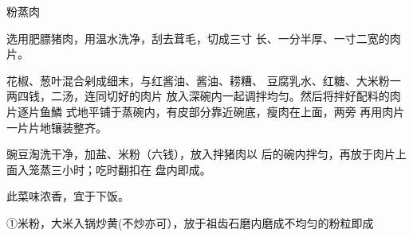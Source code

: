 \begin{recipe}{粉蒸肉}

\ingredients


\cooking

\step 	选用肥膘猪肉，用温水洗净，刮去茸毛，切成三寸 长、一分半厚、一寸二宽的肉片。

\step 	花椒、葱叶混合剁成细末，与红酱油、酱油、耢糟、 豆腐乳水、红糖、大米粉一两四钱，二汤，连同切好的肉片 放入深碗内一起调拌均匀。然后将拌好配料的肉片逐片鱼鱗 式地平铺于蒸碗内，有皮部分靠近碗底，瘦肉在上面，两旁 再用肉片一片片地镶装整齐。

\step 	豌豆淘洗干净，加盐、米粉（六钱），放入拌猪肉以 后的碗内拌匀，再放于肉片上面入笼蒸三小时；吃时翻扣在 盘内即成。

\notes

此菜味浓香，宜于下饭。

①米粉，大米入锅炒黄(不炒亦可），放于祖齿石磨内磨成不均匀的粉粒即成

\end{recipe}


